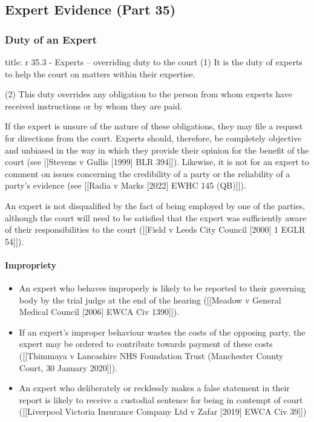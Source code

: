 \documentclass[
]{article}
\newenvironment{Shaded}{}{}
\newcommand{\NormalTok}[1]{#1}
\providecommand{\tightlist}{%
  \setlength{\itemsep}{0pt}\setlength{\parskip}{0pt}}
\begin{document}
\hypertarget{expert-evidence-part-35}{%
\subsection{Expert Evidence (Part 35)}\label{expert-evidence-part-35}}

\hypertarget{duty-of-an-expert}{%
\subsubsection{Duty of an Expert}\label{duty-of-an-expert}}

\begin{Shaded}
\begin{Highlighting}[]
\NormalTok{title: r 35.3 {-} Experts – overriding duty to the court}
\NormalTok{(1) It is the duty of experts to help the court on matters within their expertise.}

\NormalTok{(2) This duty overrides any obligation to the person from whom experts have received instructions or by whom they are paid.}
\end{Highlighting}
\end{Shaded}

If the expert is unsure of the nature of these obligations, they may
file a request for directions from the court. Experts should, therefore,
be completely objective and unbiased in the way in which they provide
their opinion for the benefit of the court (see {[}{[}Stevens v Gullis
{[}1999{]} BLR 394{]}{]}). Likewise, it is not for an expert to comment
on issues concerning the credibility of a party or the reliability of a
party's evidence (see {[}{[}Radia v Marks {[}2022{]} EWHC 145
(QB){]}{]}).

An expert is not disqualified by the fact of being employed by one of
the parties, although the court will need to be satisfied that the
expert was sufficiently aware of their responsibilities to the court
({[}{[}Field v Leeds City Council {[}2000{]} 1 EGLR 54{]}{]}).

\hypertarget{impropriety}{%
\paragraph{Impropriety}\label{impropriety}}

\begin{itemize}
\tightlist
\item
  An expert who behaves improperly is likely to be reported to their
  governing body by the trial judge at the end of the hearing
  ({[}{[}Meadow v General Medical Council {[}2006{]} EWCA Civ
  1390{]}{]}).
\item
  If an expert's improper behaviour wastes the costs of the opposing
  party, the expert may be ordered to contribute towards payment of
  these costs ({[}{[}Thimmaya v Lancashire NHS Foundation Trust
  (Manchester County Court, 30 January 2020{]}{]}).
\item
  An expert who deliberately or recklessly makes a false statement in
  their report is likely to receive a custodial sentence for being in
  contempt of court ({[}{[}Liverpool Victoria Insurance Company Ltd v
  Zafar {[}2019{]} EWCA Civ 39{]}{]})
\end{itemize}
\end{document}

